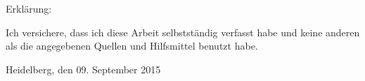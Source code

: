 \cleardoublepage
\setlength{\parindent}{0em}
\thispagestyle{empty}
Erkl\"{a}rung:\par
\vspace{3\baselineskip}
Ich versichere, dass ich diese Arbeit selbstst\"{a}ndig verfasst habe und keine
anderen als die angegebenen Quellen und Hilfsmittel benutzt habe.\par
\vspace{5\baselineskip}
Heidelberg, den 09. September 2015\hspace{3cm}\dotfill
